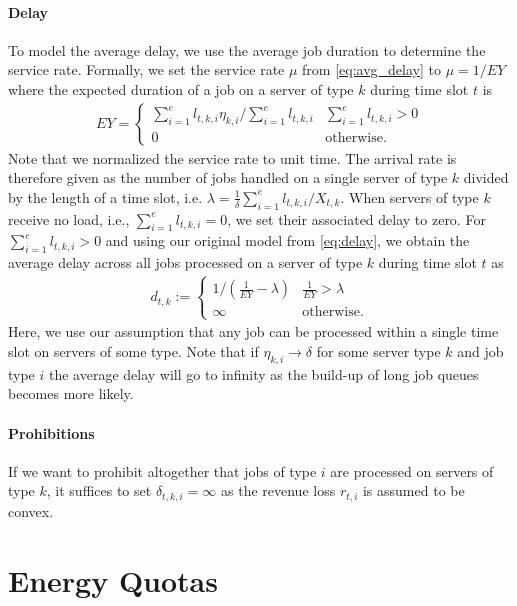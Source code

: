 \paragraph{Delay} To model the average delay, we use the average job duration to determine the service rate. Formally, we set the service rate $\mu$ from \cref{eq:avg_delay} to $\mu = 1 / E Y$ where the expected duration of a job on a server of type $k$ during time slot $t$ is \begin{align*}
    E Y = \begin{cases}
        \sum_{i=1}^e l_{t,k,i} \eta_{k,i} / \sum_{i=1}^e l_{t,k,i} & \sum_{i=1}^e l_{t,k,i} > 0 \\
        0 & \text{otherwise}.
    \end{cases}
\end{align*} Note that we normalized the service rate to unit time. The arrival rate is therefore given as the number of jobs handled on a single server of type $k$ divided by the length of a time slot, i.e. $\lambda = \frac{1}{\delta} \sum_{i=1}^e l_{t,k,i} / X_{t,k}$. When servers of type $k$ receive no load, i.e., $\sum_{i=1}^e l_{t,k,i} = 0$, we set their associated delay to zero. For $\sum_{i=1}^e l_{t,k,i} > 0$ and using our original model from \cref{eq:delay}, we obtain the average delay across all jobs processed on a server of type $k$ during time slot $t$ as \begin{align*}
    d_{t,k} := \begin{cases}
        1 / \left(\frac{1}{E Y} - \lambda\right) & \frac{1}{E Y} > \lambda \\
        \infty & \text{otherwise}.
    \end{cases}
\end{align*} Here, we use our assumption that any job can be processed within a single time slot on servers of some type. Note that if $\eta_{k,i} \to \delta$ for some server type $k$ and job type $i$ the average delay will go to infinity as the build-up of long job queues becomes more likely.

\paragraph{Prohibitions} If we want to prohibit altogether that jobs of type $i$ are processed on servers of type $k$, it suffices to set $\delta_{t,k,i} = \infty$ as the revenue loss $r_{t,i}$ is assumed to be convex.

\section{Energy Quotas}\label{section:application:energy_quotas}


